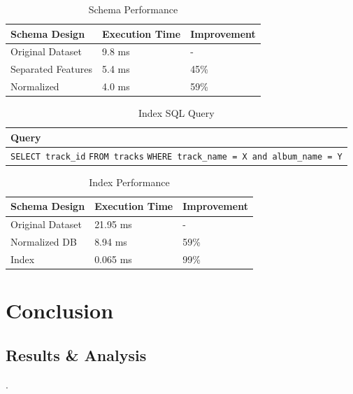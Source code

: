 \documentclass{article}
\begin{document}
{
\linespread{1.1}\selectfont
\begin{table}
\caption{Schema Performance}
\label{database_execution}
\centering
\begin{tabular}{p{3.0cm} p{2.5cm} p{2.5cm}}
  \hline
  Schema Design & Execution Time & Improvement\\
  \hline
  Original Dataset & 9.8 ms & -\\
  \hline
  Separated Features  & 5.4 ms &  45\%\\
  \hline
  Normalized & 4.0 ms & 59\%\\
  \hline
\end{tabular}
\end{table}
}

{
\linespread{1.1}\selectfont
\begin{table}
\caption{Index SQL Query}
\label{index_query}
\centering
\begin{tabular}{ p{7.5cm}}
  \hline
  Query\\
  \hline
  \verb|SELECT track_id| \newline
  \verb|FROM tracks| \newline
  \verb|WHERE track_name = X and album_name = Y| \\
  \hline
\end{tabular}
\end{table}
}

{
\linespread{1.1}\selectfont
\begin{table}
\caption{Index Performance}
\label{index_execution}
\centering
\begin{tabular}{p{3.0cm} p{2.5cm} p{2.5cm}}
  \hline
  Schema Design & Execution Time & Improvement\\
  \hline
  Original Dataset & 21.95 ms & -\\
  \hline
  Normalized DB  & 8.94 ms &  59\%\\
  \hline
  Index & 0.065 ms & 99\%\\
  \hline
\end{tabular}
\end{table}
}


\section{Conclusion}

\subsection{Results \& Analysis}
.
\end{document}
